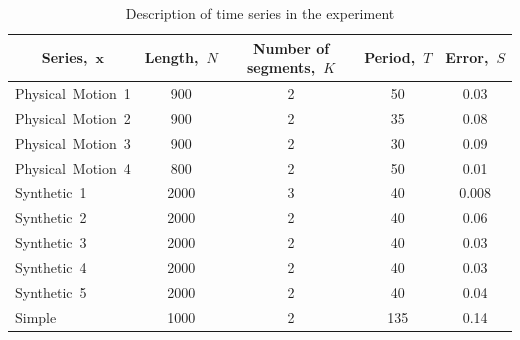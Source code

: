 \documentclass[12pt, twoside]{article}
\numberwithin{equation}{section}
\begin{document}
\begin{table}[h!t]
\begin{center}
\caption{Description of time series in the experiment}
\label{table:experiment:1}
\begin{tabular}{|c|c|c|c|c|}
\hline
	Series,~$\textbf{x}$ &Length,~$N$& Number of segments,~$K$& Period,~$T$ & Error,~$S$\\
	\hline
	\multicolumn{1}{|l|}{Physical~Motion~1}
	& 900& 2& 50& 0.03\\
	\hline
	\multicolumn{1}{|l|}{Physical~Motion~2}
	& 900& 2& 35& 0.08\\
	\hline
	\multicolumn{1}{|l|}{Physical~Motion~3}
	& 900& 2& 30& 0.09\\
	\hline
	\multicolumn{1}{|l|}{Physical~Motion~4}
	& 800& 2& 50& 0.01\\
	\hline
	\multicolumn{1}{|l|}{Synthetic~1}
	& 2000& 3& 40& 0.008\\
	\hline
	\multicolumn{1}{|l|}{Synthetic~2}
	& 2000& 2& 40& 0.06\\
	\hline
	\multicolumn{1}{|l|}{Synthetic~3}
	& 2000& 2& 40& 0.03\\
	\hline
	\multicolumn{1}{|l|}{Synthetic~4}
	& 2000& 2& 40& 0.03\\
	\hline
	\multicolumn{1}{|l|}{Synthetic~5}
	& 2000& 2& 40& 0.04\\
	\hline
	\multicolumn{1}{|l|}{Simple}
	& 1000& 2& 135& 0.14\\
\hline

\end{tabular}
\end{center}
\end{table}







\end{document}
